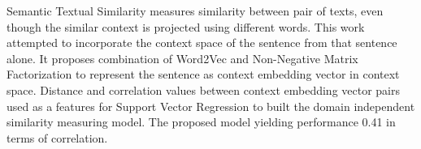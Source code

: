 Semantic Textual Similarity measures similarity between pair of texts, even though the similar context is projected using different words. This work attempted to incorporate the context space of the sentence from that sentence alone. It proposes combination of Word2Vec and Non-Negative Matrix Factorization to represent the sentence as context embedding vector in context space. Distance and correlation values between context embedding vector pairs used as a features for Support Vector Regression to built the domain independent similarity measuring model. The proposed model yielding performance 0.41 in terms of correlation.

